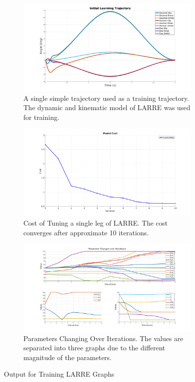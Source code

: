 \begin{figure}
    \centering
    \begin{subfigure}[b]{\textwidth}
        \centering
        \includegraphics[width=0.8\columnwidth]{images/controllers/trajs/init_traj.png}
        \caption[LARRE Training Trajectory]{A single simple trajectory used as a training trajectory. The dynamic and kinematic model of LARRE was used for training. }
        \label{fig:LARRE_Train_Trajectory}
    \end{subfigure}
    
    \begin{subfigure}[b]{\textwidth}
        \centering
        \includegraphics[width=0.8\columnwidth]{images/controllers/trajs/cost.png}
        \caption[LARRE Cost Optimization]{Cost of Tuning a single leg of LARRE. The cost converges after approximate 10 iterations. }
        \label{fig:LARRE_TUNING}
    \end{subfigure}
  
    \begin{subfigure}[b]{\textwidth}
        \centering
        \includegraphics[width=0.8\columnwidth]{images/controllers/trajs/params_splite.png}
        \caption[LARRE Parameters Optimization]{Parameters Changing Over Iterations. The values are separated into three graphs due to the different magnitude of the parameters.}
        \label{fig:LARRE_PARAMS}
    \end{subfigure}

    \caption{Output for Training LARRE Graphs}
    \label{fig:traj_training_graph}
\end{figure}



